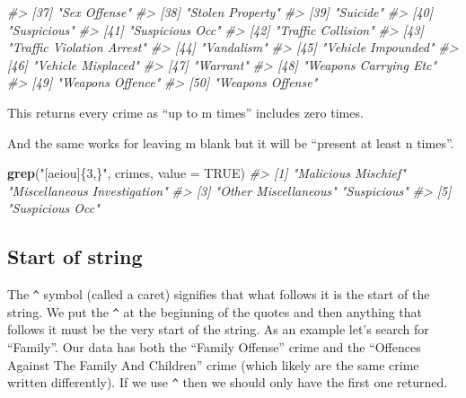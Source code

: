 \documentclass[
  12pt,
]{book}
\newenvironment{Shaded}{\begin{snugshade}}{\end{snugshade}}
\newcommand{\CommentTok}[1]{\textcolor[rgb]{0.37,0.37,0.37}{\textit{#1}}}
\newcommand{\DataTypeTok}[1]{\textcolor[rgb]{0.27,0.27,0.27}{#1}}
\newcommand{\KeywordTok}[1]{\textcolor[rgb]{0.27,0.27,0.27}{\textbf{#1}}}
\newcommand{\NormalTok}[1]{#1}
\newcommand{\OtherTok}[1]{\textcolor[rgb]{0.37,0.37,0.37}{#1}}
\newcommand{\StringTok}[1]{\textcolor[rgb]{0.5,0.5,0.5}{#1}}
\begin{document}
\begin{Shaded}
\begin{Highlighting}[]
\CommentTok{\#> [37] "Sex Offense"                               }
\CommentTok{\#> [38] "Stolen Property"                           }
\CommentTok{\#> [39] "Suicide"                                   }
\CommentTok{\#> [40] "Suspicious"                                }
\CommentTok{\#> [41] "Suspicious Occ"                            }
\CommentTok{\#> [42] "Traffic Collision"                         }
\CommentTok{\#> [43] "Traffic Violation Arrest"                  }
\CommentTok{\#> [44] "Vandalism"                                 }
\CommentTok{\#> [45] "Vehicle Impounded"                         }
\CommentTok{\#> [46] "Vehicle Misplaced"                         }
\CommentTok{\#> [47] "Warrant"                                   }
\CommentTok{\#> [48] "Weapons Carrying Etc"                      }
\CommentTok{\#> [49] "Weapons Offence"                           }
\CommentTok{\#> [50] "Weapons Offense"}
\end{Highlighting}
\end{Shaded}

This returns every crime as ``up to m times'' includes zero times.

And the same works for leaving m blank but it will be ``present at least n times''.

\begin{Shaded}
\begin{Highlighting}[]
\KeywordTok{grep}\NormalTok{(}\StringTok{"[aeiou]\{3,\}"}\NormalTok{, crimes, }\DataTypeTok{value =} \OtherTok{TRUE}\NormalTok{)}
\CommentTok{\#> [1] "Malicious Mischief"          "Miscellaneous Investigation"}
\CommentTok{\#> [3] "Other Miscellaneous"         "Suspicious"                 }
\CommentTok{\#> [5] "Suspicious Occ"}
\end{Highlighting}
\end{Shaded}

\hypertarget{start-of-string}{%
\subsection{Start of string}\label{start-of-string}}

The \texttt{\^{}} symbol (called a caret) signifies that what follows it is the start of the string. We put the \texttt{\^{}} at the beginning of the quotes and then anything that follows it must be the very start of the string. As an example let's search for ``Family''. Our data has both the ``Family Offense'' crime and the ``Offences Against The Family And Children'' crime (which likely are the same crime written differently). If we use \texttt{\^{}} then we should only have the first one returned.
\end{document}
